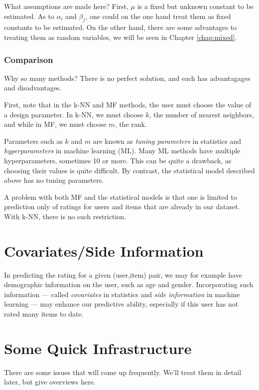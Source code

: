 What assumptions are made here?  First, $\mu$ is a fixed but unknown
constant to be estimated.  As to $\alpha_i$ and $\beta_j$, one could on
the one hand treat them as fixed constants to be estimated.  On the
other hand, there are some advantages to treating them as random
variables, we will be seen in Chapter \ref{chap:mixed}.

\subsubsection{Comparison}

Why so many methods?  There is no perfect solution, and each has
advantagages and disadvantages.

First, note that in the k-NN and MF methods, the user must choose the
value of a design parameter.  In k-NN, we must choose $k$, the number of
nearest neighbors, and while in MF, we must choose $m$, the rank.

Parameters such as $k$ and $m$ are known as \textit{tuning parameters}
in statistics and \textit{hyperparameters} in machine learning (ML).
Many ML methods have multiple hyperparameters, sometimes 10 or more.
This can be quite a drawback, as choosing their values is quite
difficult.  By contrast, the statistical model described above has no
tuning parameters.

A problem with both MF and the statistical models is that one is limited
to prediction only of ratings for users and items that are already in
our dataset.  With k-NN, there is no such restriction.

\section{Covariates/Side Information}

In predicting the rating for a given (user,item) pair, we may for
example have demographic information on the user, such as age and
gender.  Incorporating such information --- called \textit{covariates}
in statistics and \textit{side information} in machine learning --- may
enhance our predictive ability, especially if this user has not rated
many items to date.

\section{Some Quick Infrastructure}

There are some issues that will come up frequently.  We'll treat them in
detail later, but give overviews here.

